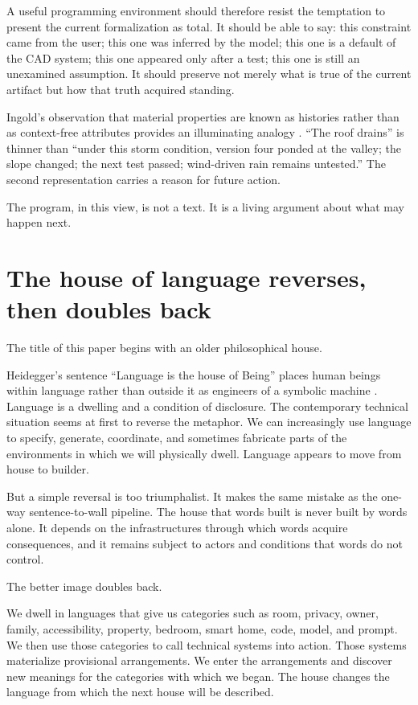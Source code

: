\documentclass[11pt]{article}
\begin{document}
A useful programming environment should therefore resist the temptation to present the current formalization as total. It should be able to say: this constraint came from the user; this one was inferred by the model; this one is a default of the CAD system; this one appeared only after a test; this one is still an unexamined assumption. It should preserve not merely what is true of the current artifact but how that truth acquired standing.

Ingold's observation that material properties are known as histories rather than as context-free attributes provides an illuminating analogy \citep[30--31]{ingold2013making}. ``The roof drains'' is thinner than ``under this storm condition, version four ponded at the valley; the slope changed; the next test passed; wind-driven rain remains untested.'' The second representation carries a reason for future action.

The program, in this view, is not a text. It is a living argument about what may happen next.

\section{The house of language reverses, then doubles back}

The title of this paper begins with an older philosophical house.

Heidegger's sentence ``Language is the house of Being'' places human beings within language rather than outside it as engineers of a symbolic machine \citep[239]{heidegger1998letter}. Language is a dwelling and a condition of disclosure. The contemporary technical situation seems at first to reverse the metaphor. We can increasingly use language to specify, generate, coordinate, and sometimes fabricate parts of the environments in which we will physically dwell. Language appears to move from house to builder.

But a simple reversal is too triumphalist. It makes the same mistake as the one-way sentence-to-wall pipeline. The house that words built is never built by words alone. It depends on the infrastructures through which words acquire consequences, and it remains subject to actors and conditions that words do not control.

The better image doubles back.

We dwell in languages that give us categories such as room, privacy, owner, family, accessibility, property, bedroom, smart home, code, model, and prompt. We then use those categories to call technical systems into action. Those systems materialize provisional arrangements. We enter the arrangements and discover new meanings for the categories with which we began. The house changes the language from which the next house will be described.
\end{document}
